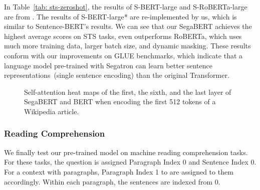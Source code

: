 \documentclass[letterpaper]{article}
\begin{document}
In Table~\ref{tab: sts-zeroshot}, the results of S-BERT-large and S-RoBERTa-large are from \citet{DBLP:conf/emnlp/sbert}. 
The results of S-BERT-large* are re-implemented by us, which is similar to Sentence-BERT's results.
We can see that our SegaBERT achieves the highest average scores on STS tasks, even outperforms RoBERTa, which uses much more training data, larger batch size, and dynamic masking.
These results conform with our improvements on GLUE benchmarks, which indicate that a language model pre-trained with Segatron can learn better sentence representations~(single sentence encoding) than the original Transformer.

\begin{figure*}[t]
  \centering


  
  \caption{Self-attention heat maps of the first, the sixth, and the last layer of SegaBERT and BERT when encoding the first 512 tokens of a Wikipedia article.}
  \label{fig:heatmap}
\end{figure*} 
\subsubsection{Reading Comprehension}
We finally test our pre-trained model on machine reading comprehension tasks.
For these tasks, the question is assigned Paragraph Index 0 and Sentence Index 0.
For a context with  paragraphs, Paragraph Index 1 to  are assigned to them accordingly.
Within each paragraph, the sentences are indexed from 0.
\end{document}
